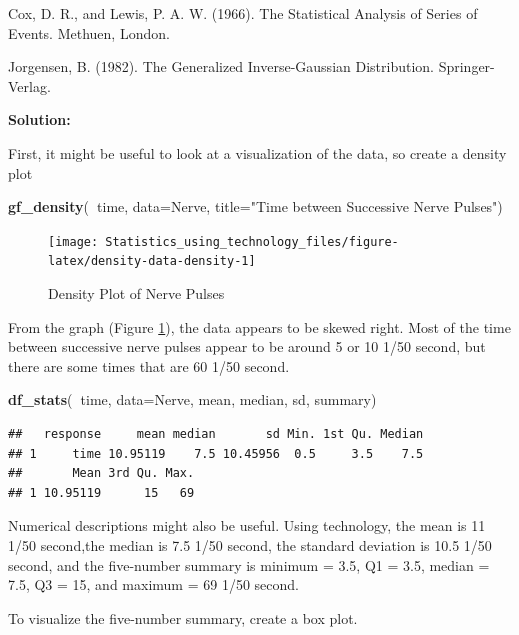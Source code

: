 \documentclass[
]{book}
\newenvironment{Shaded}{\begin{snugshade}}{\end{snugshade}}
\newcommand{\DataTypeTok}[1]{\textcolor[rgb]{0.13,0.29,0.53}{#1}}
\newcommand{\KeywordTok}[1]{\textcolor[rgb]{0.13,0.29,0.53}{\textbf{#1}}}
\newcommand{\NormalTok}[1]{#1}
\newcommand{\OperatorTok}[1]{\textcolor[rgb]{0.81,0.36,0.00}{\textbf{#1}}}
\newcommand{\StringTok}[1]{\textcolor[rgb]{0.31,0.60,0.02}{#1}}
\begin{document}
Cox, D. R., and Lewis, P. A. W. (1966). The Statistical Analysis of Series of Events. Methuen, London.

Jorgensen, B. (1982). The Generalized Inverse-Gaussian Distribution. Springer-Verlag.

\textbf{Solution:}

First, it might be useful to look at a visualization of the data, so create a density plot



\begin{Shaded}
\begin{Highlighting}[]
\KeywordTok{gf_density}\NormalTok{(}\OperatorTok{~}\NormalTok{time, }\DataTypeTok{data=}\NormalTok{Nerve, }\DataTypeTok{title=}\StringTok{"Time between Successive Nerve Pulses"}\NormalTok{)}
\end{Highlighting}
\end{Shaded}

\begin{figure}
\texttt{[image: Statistics\_using\_technology\_files/figure-latex/density-data-density-1]} \caption{Density Plot of Nerve Pulses}\label{fig:density-data-density}
\end{figure}

From the graph (Figure \ref{fig:density-data-density}), the data appears to be skewed right. Most of the time between successive nerve pulses appear to be around 5 or 10 1/50 second, but there are some times that are 60 1/50 second.

\begin{Shaded}
\begin{Highlighting}[]
\KeywordTok{df_stats}\NormalTok{(}\OperatorTok{~}\NormalTok{time, }\DataTypeTok{data=}\NormalTok{Nerve, mean, median, sd, summary)}
\end{Highlighting}
\end{Shaded}

\begin{verbatim}
##   response     mean median       sd Min. 1st Qu. Median
## 1     time 10.95119    7.5 10.45956  0.5     3.5    7.5
##       Mean 3rd Qu. Max.
## 1 10.95119      15   69
\end{verbatim}

Numerical descriptions might also be useful. Using technology, the mean is 11 1/50 second,the median is 7.5 1/50 second, the standard deviation is 10.5 1/50 second, and the five-number summary is minimum = 3.5, Q1 = 3.5, median = 7.5, Q3 = 15, and maximum = 69 1/50 second.

To visualize the five-number summary, create a box plot.
\end{document}
